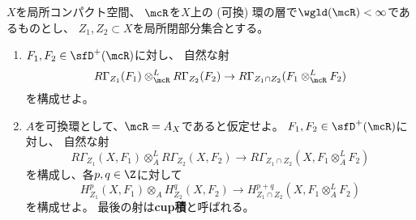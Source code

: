 \documentclass[uplatex,dvipdfmx]{jsarticle}
\begin{document}
\maketitle
\HeaderCommentA
\section{}

\fi

\begin{prob}\label{2.17}
  \(X\)を局所コンパクト空間、
  \(\mcR\)を\(X\)上の (可換) 環の層で\(\wgld(\mcR)<\infty\)であるものとし、
  \(Z_1,Z_2\subset X\)を局所閉部分集合とする。
  \begin{enumerate}
    \item \label{2.17.1}
    \(F_1,F_2\in \sfD^+(\mcR)\)に対し、
    自然な射
    \[
    R\Gamma_{Z_1}(F_1)\otimes_{\mcR}^L R\Gamma_{Z_2}(F_2)
    \to R\Gamma_{Z_1\cap Z_2}(F_1\otimes_{\mcR}^L F_2)
    \]
    を構成せよ。
    \item \label{2.17.2}
    \(A\)を可換環として、\(\mcR=A_X\)であると仮定せよ。
    \(F_1,F_2\in \sfD^+(\mcR)\)に対し、
    自然な射
    \[
    R\Gamma_{Z_1}(X,F_1)\otimes_A^L R\Gamma_{Z_2}(X,F_2)
    \to R\Gamma_{Z_1\cap Z_2}(X,F_1\otimes_A^L F_2)
    \]
    を構成し、各\(p,q\in \Z\)に対して
    \[
    H^p_{Z_1}(X,F_1)\otimes_A H^q_{Z_2}(X,F_2)
    \to H^{p+q}_{Z_1\cap Z_2}(X,F_1\otimes_A^L F_2)
    \]
    を構成せよ。
    最後の射は\textbf{cup積}と呼ばれる。
  \end{enumerate}
\end{prob}
\end{document}
